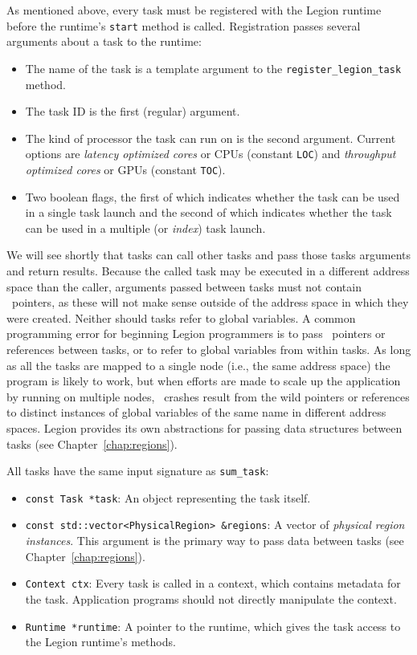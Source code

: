 As mentioned above, every task must be registered with the Legion runtime before
the runtime's {\tt start} method is called.  Registration passes several arguments about a
task to the runtime:
\begin{itemize}
\item The name of the task is a template argument to the {\tt register\_legion\_task} method.

\item The task ID is the first (regular) argument.

\item The kind of processor the task can run on is the second argument.  Current options are
{\em latency optimized cores} or CPUs (constant {\tt LOC}) and {\em throughput optimized cores} or GPUs
(constant {\tt TOC}).

\item Two boolean flags, the first of which indicates whether the task can be used in a single task
launch and the second of which indicates whether the task can be used in a multiple (or {\em index}) task
launch.
\end{itemize}

We will see shortly that tasks can call other tasks and pass
those tasks arguments and return results.  Because the called task may
be executed in a different address space than the caller, arguments
passed between tasks must not contain \Cpp\ pointers, as these will
not make sense outside of the address space in which they were
created.  Neither should tasks refer to global variables. A common
programming error for beginning Legion programmers is to pass
\Cpp\ pointers or references between tasks, or to refer to global
variables from within tasks.  As long as all the tasks are mapped to a
single node (i.e., the same address space) the program is likely to
work, but when efforts are made to scale up the application by running
on multiple nodes, \Cpp\ crashes result from the wild pointers or
references to distinct instances of global variables of the same name
in different address spaces.  Legion provides its own abstractions for
passing data structures between tasks (see
Chapter~\ref{chap:regions}).

All tasks have the same input signature as {\tt sum\_task}:
\begin{itemize}

\item {\tt const Task *task}: An object representing the task itself. 

\item {\tt const std::vector<PhysicalRegion> \&regions}: A vector of {\em physical region instances}.  This argument is the
primary way to pass data between tasks (see Chapter~\ref{chap:regions}).

\item {\tt Context ctx}: Every task is called in a context, which contains metadata for the task.  Application programs
should not directly manipulate the context.

\item {\tt Runtime *runtime}: A pointer to the runtime, which gives the task access to the Legion runtime's methods.

\end{itemize}

